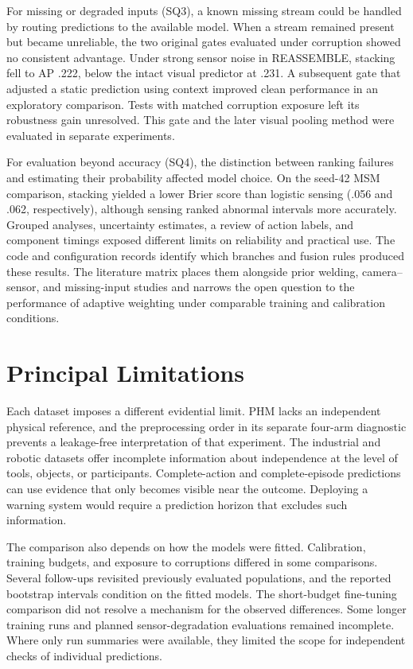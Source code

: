For missing or degraded inputs (SQ3), a known missing stream could be handled by routing predictions to the available model. When a stream remained present but became unreliable, the two original gates evaluated under corruption showed no consistent advantage. Under strong sensor noise in REASSEMBLE, stacking fell to AP .222, below the intact visual predictor at .231. A subsequent gate that adjusted a static prediction using context improved clean performance in an exploratory comparison. Tests with matched corruption exposure left its robustness gain unresolved. This gate and the later visual pooling method were evaluated in separate experiments.

For evaluation beyond accuracy (SQ4), the distinction between ranking failures and estimating their probability affected model choice. On the seed-42 MSM comparison, stacking yielded a lower Brier score than logistic sensing (.056 and .062, respectively), although sensing ranked abnormal intervals more accurately. Grouped analyses, uncertainty estimates, a review of action labels, and component timings exposed different limits on reliability and practical use. The code and configuration records identify which branches and fusion rules produced these results. The literature matrix places them alongside prior welding, camera--sensor, and missing-input studies and narrows the open question to the performance of adaptive weighting under comparable training and calibration conditions.

\section{Principal Limitations}
Each dataset imposes a different evidential limit. PHM lacks an independent physical reference, and the preprocessing order in its separate four-arm diagnostic prevents a leakage-free interpretation of that experiment. The industrial and robotic datasets offer incomplete information about independence at the level of tools, objects, or participants. Complete-action and complete-episode predictions can use evidence that only becomes visible near the outcome. Deploying a warning system would require a prediction horizon that excludes such information.

The comparison also depends on how the models were fitted. Calibration, training budgets, and exposure to corruptions differed in some comparisons. Several follow-ups revisited previously evaluated populations, and the reported bootstrap intervals condition on the fitted models. The short-budget fine-tuning comparison did not resolve a mechanism for the observed differences. Some longer training runs and planned sensor-degradation evaluations remained incomplete. Where only run summaries were available, they limited the scope for independent checks of individual predictions.

